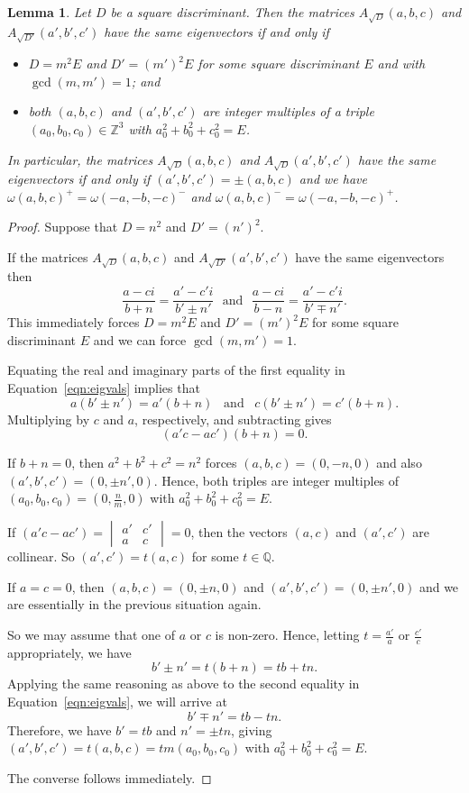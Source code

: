 \documentclass[10pt,a4paper]{amsart}
\newtheorem{lemma}[theorem]{Lemma}
\newcommand{\Q}{\mathbb{Q}}
\newcommand{\Z}{\mathbb{Z}}
\begin{document}
\begin{lemma}\label{lem:TTZ3}
    Let $D$ be a square discriminant. Then the matrices $A_{\sqrt{D}}(a,b,c)$ and $A_{\sqrt{D'}}(a',b',c')$ have the same eigenvectors if and only if
    \begin{itemize}
        \item[(i)] $D = m^2E$ and $D' = (m')^2E$ for some square discriminant $E$ and with $\gcd(m,m') = 1$; and 
        \item[(ii)] both $(a,b,c)$ and $(a',b',c')$ are integer multiples of a triple $(a_0,b_0,c_0)\in\Z^{3}$ with $a_0^{2}+b_0^{2}+c_0^{2} = E$.
    \end{itemize}
    In particular, the matrices $A_{\sqrt{D}}(a,b,c)$ and $A_{\sqrt{D}}(a',b',c')$ have the same eigenvectors if and only if $(a',b',c') = \pm(a,b,c)$ and we have $\omega(a,b,c)^{+} = \omega(-a,-b,-c)^{-}$ and $\omega(a,b,c)^{-} = \omega(-a,-b,-c)^{+}$.
\end{lemma}

\begin{proof}
    Suppose that $D = n^2$ and $D' = (n')^2$.
    
    If the matrices $A_{\sqrt{D}}(a,b,c)$ and $A_{\sqrt{D'}}(a',b',c')$ have the same eigenvectors then
    \begin{equation}\label{eqn:eigvals}
        \frac{a-ci}{b+n} = \frac{a'-c'i}{b'\pm n'}\,\,\,\,\text{and}\,\,\,\,\frac{a-ci}{b-n} = \frac{a'-c'i}{b'\mp n'}.
    \end{equation}
    This immediately forces $D = m^2E$ and $D' = (m')^2E$ for some square discriminant $E$ and we can force $\gcd(m,m') = 1$.

    Equating the real and imaginary parts of the first equality in Equation~\ref{eqn:eigvals} implies that
    \[a(b'\pm n') = a'(b+n)\,\,\,\,\,\text{and}\,\,\,\,\,c(b'\pm n')=c'(b+n).\]
    Multiplying by $c$ and $a$, respectively, and subtracting gives
    \[(a'c-ac')(b+n) = 0.\]

    If $b + n = 0$, then $a^2+b^2+c^2 = n^2$ forces $(a,b,c) = (0,-n,0)$ and also $(a',b',c') = (0,\pm n',0)$. Hence, both triples are integer multiples of $(a_0,b_0,c_0) = (0,\frac{n}{m},0)$ with $a_0^2+b_0^2+c_0^2 = E$.

    If $(a'c-ac') = \begin{vmatrix}
        a' & c' \\
        a & c
    \end{vmatrix} = 0$, then the vectors $(a,c)$ and $(a',c')$ are collinear. So $(a',c') = t(a,c)$ for some $t\in\Q$.
    
    If $a = c = 0$, then $(a,b,c) = (0,\pm n,0)$ and $(a',b',c') = (0,\pm n',0)$ and we are essentially in the previous situation again.
    
    So we may assume that one of $a$ or $c$ is non-zero. Hence, letting $t = \frac{a'}{a}$ or $\frac{c'}{c}$ appropriately, we have
    \[b'\pm n' = t(b+n) = tb+tn.\]
    Applying the same reasoning as above to the second equality in Equation~\ref{eqn:eigvals}, we will arrive at
    \[b'\mp n'= tb-tn.\]
    Therefore, we have $b' = tb$ and $n' = \pm tn$, giving $(a',b',c') = t(a,b,c) = tm(a_0,b_0,c_0)$ with $a_0^2+b_0^2+c_0^2 = E$.

    The converse follows immediately.
\end{proof}
\end{document}
